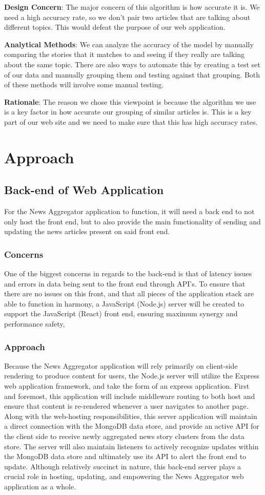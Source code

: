 \documentclass[onecolumn, draftclsnofoot,10pt, compsoc]{IEEEtran}
\begin{document}
\hangindent=0.5cm \textbf{Design Concern}: The major concern of this algorithm is how accurate it is. We need a high accuracy rate, so we don't pair two articles that are talking about different topics. This would defeat the purpose of our web application.

\hangindent=0.5cm \textbf{Analytical Methods}: We can analyze the accuracy of the model by manually comparing the stories that it matches to and seeing if they really are talking about the same topic. There are also ways to automate this by creating a test set of our data and manually grouping them and testing against that grouping. Both of these methods will involve some manual testing.

\hangindent=0.5cm \textbf{Rationale}: The reason we chose this viewpoint is because the algorithm we use is a key factor in how accurate our grouping of similar articles is. This is a key part of our web site and we need to make sure that this has high accuracy rates.

\section{Approach}
\subsection{Back-end of Web Application}
For the News Aggregator application to function, it will need a back end to not only host the front end, but to also provide the main functionality of sending and updating the news articles present on said front end.
\subsubsection{Concerns}
One of the biggest concerns in regards to the back-end is that of latency issues and errors in data being sent to the front end through API's. To ensure that there are no issues on this front, and that all pieces of the application stack are able to function in harmony, a JavaScript (Node.js) server will be created to support the JavaScript (React) front end, ensuring maximum synergy and performance safety,
\subsubsection{Approach}
Because the News Aggregator application will rely primarily on client-side rendering to produce content for users, the Node.js server will utilize the Express web application framework, and take the form of an express application. First and foremost, this application will include middleware routing to both host and ensure that content is re-rendered whenever a user navigates to another page. Along with the web-hosting responsibilities, this server application will maintain a direct connection with the MongoDB data store, and provide an active API for the client side to receive newly aggregated news story clusters from the data store. The server will also maintain listeners to actively recognize updates within the MongoDB data store and ultimately use its API to alert the front end to update. Although relatively succinct in nature, this back-end server plays a crucial role in hosting, updating, and empowering the News Aggregator web application as a whole.
\end{document}
